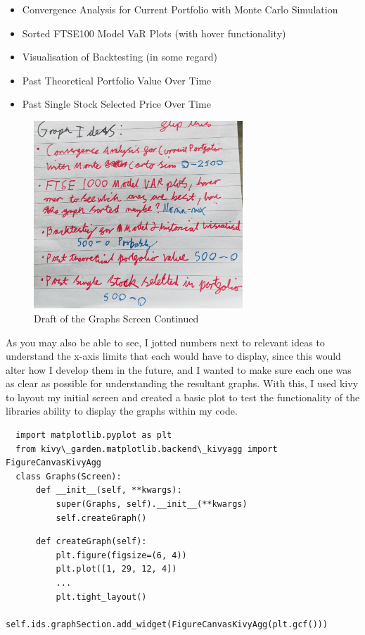 \documentclass{article}
\begin{document}
\begin{itemize}
  \item Convergence Analysis for Current Portfolio with Monte Carlo Simulation
  \item Sorted FTSE100 Model VaR Plots (with hover functionality)
  \item Visualisation of Backtesting (in some regard)
  \item Past Theoretical Portfolio Value Over Time
  \item Past Single Stock Selected Price Over Time
\end{itemize}

\begin{figure}[h]
  \centering
  \includegraphics[width=0.7\textwidth]{Images/Term 2 Images/IMG_1349 (1).jpg}
  \caption{Draft of the Graphs Screen Continued}
  \label{fig:Graphs Screen Draft 2}
\end{figure}

\vspace{0.3cm}
As you may also be able to see, I jotted numbers next to relevant ideas to understand the x-axis limits that each would have to display, since this would alter how I develop them in the future, and I wanted to make sure each one was as clear as possible for understanding the resultant graphs. With this, I used kivy to layout my initial screen and created a basic plot to test the functionality of the libraries ability to display the graphs within my code. \\\vspace{0.3cm}

\begin{verbatim}
  import matplotlib.pyplot as plt
  from kivy\_garden.matplotlib.backend\_kivyagg import FigureCanvasKivyAgg
  class Graphs(Screen):
      def __init__(self, **kwargs):
          super(Graphs, self).__init__(**kwargs)
          self.createGraph()
\end{verbatim}
\begin{verbatim}
      def createGraph(self):
          plt.figure(figsize=(6, 4))
          plt.plot([1, 29, 12, 4])
          ...
          plt.tight_layout()
          self.ids.graphSection.add_widget(FigureCanvasKivyAgg(plt.gcf()))
\end{verbatim}
\end{document}

